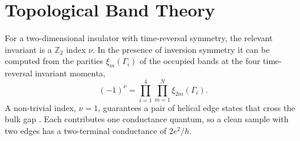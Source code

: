 \chapter{Topological Band Theory}
\label{ch:background}

For a two-dimensional insulator with time-reversal symmetry, the relevant invariant is a
$\mathbb{Z}_2$ index $\nu$. In the presence of inversion symmetry it can be computed from the
parities $\xi_m(\Gamma_i)$ of the occupied bands at the four time-reversal invariant momenta,
\begin{equation}
  (-1)^{\nu} = \prod_{i=1}^{4} \prod_{m=1}^{N} \xi_{2m}(\Gamma_i).
  \label{eq:z2}
\end{equation}
A non-trivial index, $\nu = 1$, guarantees a pair of helical edge states that cross the bulk
gap \citep{hasan2010}. Each contributes one conductance quantum, so a clean sample with
two edges has a two-terminal conductance of $2e^2/h$.
